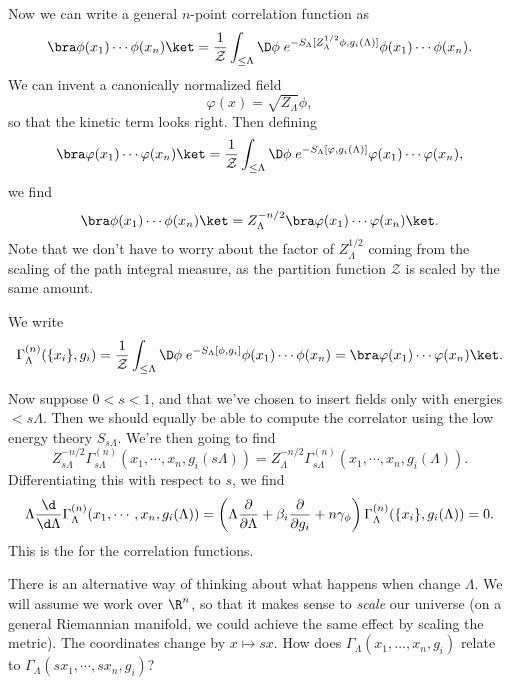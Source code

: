 \documentclass[a4paper]{article}
\begin{document}
Now we can write a general $n$-point correlation function as
\[
  \bra \phi(x_1) \cdots \phi(x_n)\ket = \frac{1}{\mathcal{Z}} \int_{\leq \Lambda} \D \phi\; e^{-S_\Lambda[Z_\Lambda^{1/2} \phi, g_i(\Lambda)]} \phi(x_1) \cdots \phi(x_n).
\]
We can invent a canonically normalized field
\[
  \varphi(x) = \sqrt{Z_\Lambda} \phi,
\]
so that the kinetic term looks right. Then defining
\[
  \bra \varphi(x_1) \cdots \varphi(x_n)\ket = \frac{1}{\mathcal{Z}}\int_{\leq \Lambda} \D \phi\; e^{-S_\Lambda[\varphi, g_i(\Lambda)]} \varphi(x_1) \cdots \varphi(x_n),
\]
we find
\[
  \bra \phi(x_1) \cdots \phi(x_n)\ket = Z_\Lambda^{-n/2} \bra \varphi(x_1) \cdots \varphi(x_n)\ket.
\]
Note that we don't have to worry about the factor of $Z_\Lambda^{1/2}$ coming from the scaling of the path integral measure, as the partition function $\mathcal{Z}$ is scaled by the same amount.
\begin{defi}
  We write
  \[
    \Gamma_\Lambda^{(n)} (\{x_i\}, g_i) = \frac{1}{\mathcal{Z}}\int_{\leq \Lambda} \D \phi\; e^{-S_\Lambda[\phi, g_i]} \phi(x_1) \cdots \phi(x_n) = \bra \varphi(x_1) \cdots \varphi(x_n)\ket.
  \]
\end{defi}
Now suppose $0 < s < 1$, and that we've chosen to insert fields only with energies $< s \Lambda$. Then we should equally be able to compute the correlator using the low energy theory $S_{s\Lambda}$. We're then going to find
\[
  Z^{-n/2}_{s\Lambda} \Gamma_{s\Lambda}^{(n)} (x_1, \cdots, x_n, g_i(s\Lambda)) = Z_\Lambda^{-n/2} \Gamma^{(n)}_{s\Lambda} (x_1, \cdots, x_n, g_i(\Lambda)).
\]
Differentiating this with respect to $s$, we find
\[
  \Lambda \frac{\d}{\d \Lambda} \Gamma_\Lambda^{(n)}(x_1, \cdots, x_n, g_i(\Lambda)) = \left(\Lambda \frac{\partial}{\partial \Lambda} + \beta_i \frac{\partial}{\partial g_i} + n \gamma_\phi\right) \Gamma_\Lambda^{(n)} ( \{x_i\}, g_i(\Lambda)) = 0.
\]
This is the  for the correlation functions.

There is an alternative way of thinking about what happens when change $\Lambda$. We will assume we work over $\R^n$, so that it makes sense to \emph{scale} our universe (on a general Riemannian manifold, we could achieve the same effect by scaling the metric). The coordinates change by $x \mapsto sx$. How does $\Gamma_\Lambda(x_1,. .., x_n, g_i)$ relate to $\Gamma_\Lambda(s x_1, \cdots, s x_n, g_i)$?
\end{document}
